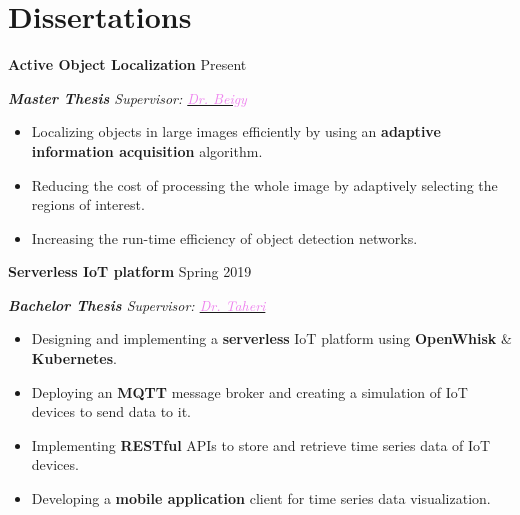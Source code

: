 \documentclass[11pt,a4paper,roman]{moderncv} %
\begin{document}
\section{Dissertations}

\textbf{Active Object Localization} \hfill Present
\begin{adjustwidth}{0.2in}{0in}
	\emph{\textbf{Master Thesis} \textendash Supervisor: \href{http://sharif.edu/~beigy}{\textcolor{violet}{Dr. Beigy}}}
	\begin{itemize}
		\item Localizing objects in large images efficiently by using an \textbf{adaptive information acquisition} algorithm.
		\item Reducing the cost of processing the whole image by adaptively selecting the regions of interest.
		\item Increasing the run-time efficiency of object detection networks.
	\end{itemize}
\end{adjustwidth}

\vspace{3pt}

\textbf{Serverless IoT platform} \hfill Spring 2019
\begin{adjustwidth}{0.2in}{0in}
	\emph{\textbf{Bachelor Thesis} \textendash Supervisor: \href{https://aut.ac.ir/cv/2222/HASSAN-TAHERI?slc_lang=en}{\textcolor{violet}{Dr. Taheri}}}
	\begin{itemize}
		\item Designing and implementing a \textbf{serverless} IoT platform using \textbf{OpenWhisk} \& \textbf{Kubernetes}.
		\item Deploying an \textbf{MQTT} message broker and creating a simulation of IoT devices to send data to it.
		\item Implementing \textbf{RESTful} APIs to store and retrieve time series data of IoT devices.
		\item Developing a \textbf{mobile application} client for time series data visualization.
	\end{itemize}
\end{adjustwidth}

\end{document}
